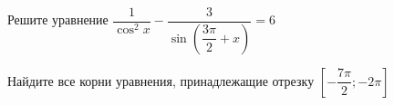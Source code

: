 \begin{ex}
	\begin{condition}
		\begin{enumcols}[label=\asbuk*)]
			\item Решите уравнение \( \dfrac{1}{\cos^2 x} - \dfrac{3}{\sin\left(\dfrac{3\pi}{2}+x\right)} = 6 \)
			\item Найдите все корни уравнения, принадлежащие отрезку \(  \left[-\dfrac{7\pi}{2};-2\pi\right]\)
		\end{enumcols}
	\end{condition}
\end{ex}